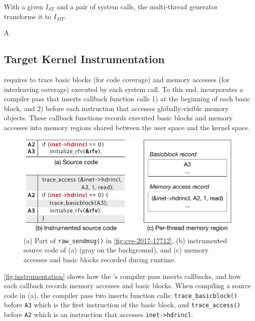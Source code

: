 With a given $I_{ST}$ and a pair of system calls, the multi-thread
generator transforms it to $I_{MT}$.




%
A 





\subsection{Target Kernel Instrumentation}
\label{ss:instrumentation}

\sys requires to trace basic blocks (for code coverage) and memory
accesses (for interleaving coverage) executed by each system call.
%
To this end, \sys incorporates a compiler pass that inserts callback
function calls 1) at the beginning of each basic block, and 2) before
each instruction that accesses globally-visible memory objects.
%
These callback functions records executed basic blocks and memory
accesses into memory regions shared between the user space and the
kernel space.



\begin{figure}
  \centering
  \includegraphics[width=\linewidth]{fig/instrumentation.pdf}
  \caption{(a) Part of \texttt{raw_sendmsg()} in
    \autoref{fig:cve-2017-17712}, (b) instrumented source code of (a)
    (gray on the background), and (c) memory accesses and basic blocks
    recorded during runtime.}
  \label{fig:instrumentation}
\end{figure}

\autoref{fig:instrumentation} shows how the \sys's compiler pass
inserts callbacks, and how each callback records memory accesses and
basic blocks.
%
When compiling a source code in (a), the compiler pass two inserts
function calls; \texttt{trace_basicblock()} before \texttt{A3} which
is the first instruction of the basic block, and
\texttt{trace_access()} before \texttt{A2} which is an instruction
that accesses \texttt{inet->hdrincl}.


